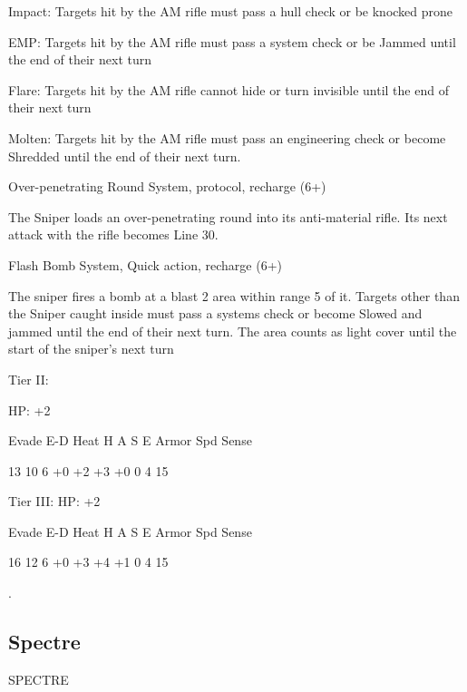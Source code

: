 	        Impact: Targets hit by the AM rifle must pass a hull check or be knocked prone
 
         EMP: Targets hit by the AM rifle must pass a system check or be Jammed until the end of  
         their next turn
 
         Flare: Targets hit by the AM rifle cannot hide or turn invisible until the end of their next  
         turn
 
         Molten: Targets hit by the AM rifle must pass an engineering check or become Shredded  
         until the end of their next turn.
 

Over-penetrating Round  
System, protocol, recharge (6+)
 
The Sniper loads an over-penetrating round into its anti-material rifle. Its next attack with the rifle  
becomes Line 30.
 

Flash Bomb  
System, Quick action, recharge (6+)
 
The sniper fires a bomb at a blast 2 area within range 5 of it. Targets other than the Sniper caught  
inside must pass a systems check or become Slowed and jammed until the end of their next  
turn. The area counts as light cover until the start of the sniper’s next turn
 

Tier II:
 
HP: +2
 

          Evade     E-D    Heat    H    A     S     E        Armor        Spd      Sense 

          13        10     6       +0    +2   +3    +0       0            4        15 

                                                                                                                 


Tier III:  
HP: +2
 

           Evade       E-D     Heat     H      A     S      E         Armor          Spd        Sense 

             16         12     6          +0    +3     +4    +1        0              4          15 

.  

                                                                                                                                  
\subsection{Spectre}

                                               SPECTRE  

